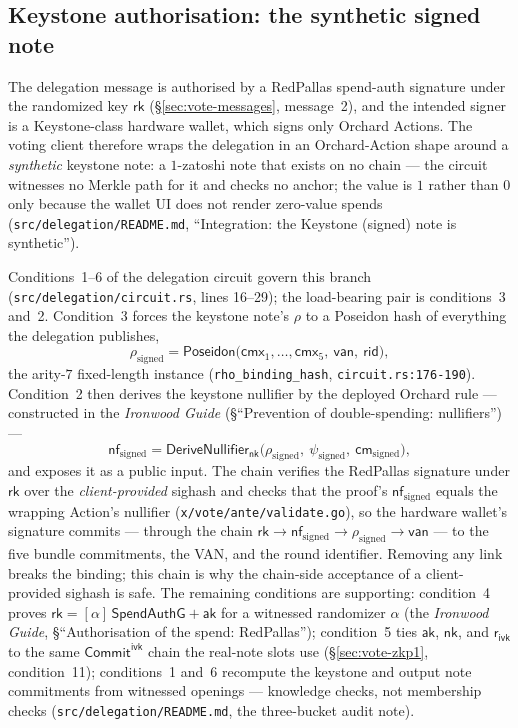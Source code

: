 \documentclass[11pt,a4paper]{article}
\theoremstyle{definition}
\newcommand{\nfsym}{\mathsf{nf}}
\newcommand{\cmsym}{\mathsf{cm}}
\newcommand{\cmx}{\mathsf{cmx}}
\newcommand{\rk}{\mathsf{rk}}
\newcommand{\CommitIvk}{\ensuremath{\mathsf{Commit}^{\mathsf{ivk}}}}
\newcommand{\aksym}{\ensuremath{\mathsf{ak}}}
\newcommand{\nksym}{\ensuremath{\mathsf{nk}}}
\newcommand{\rivk}{\ensuremath{\mathsf{r_{ivk}}}}
\begin{document}
\subsection{Keystone authorisation: the synthetic signed note}
\label{sec:vote-keystone}

The delegation message is authorised by a RedPallas spend-auth signature
under the randomized key $\rk$ (\S\ref{sec:vote-messages}, message~2), and
the intended signer is a Keystone-class hardware wallet, which signs only
Orchard Actions. The voting client therefore wraps the delegation in an
Orchard-Action shape around a \emph{synthetic} keystone note: a
$1$-zatoshi note that exists on no chain --- the circuit witnesses no
Merkle path for it and checks no anchor; the value is $1$ rather than $0$
only because the wallet UI does not render zero-value spends
(\texttt{src/delegation/README.md}, ``Integration: the Keystone (signed)
note is synthetic'').

Conditions~1--6 of the delegation circuit govern this branch
(\texttt{src/delegation/circuit.rs}, lines 16--29); the load-bearing pair
is conditions~3 and~2. Condition~3 forces the keystone note's $\rho$ to a
Poseidon hash of everything the delegation publishes,
\[
\rho_{\mathrm{signed}} = \mathsf{Poseidon}\bigl(\cmx_1, \ldots, \cmx_5,\
\mathsf{van},\ \mathsf{rid}\bigr),
\]
the arity-$7$ fixed-length instance (\texttt{rho\_binding\_hash},
\texttt{circuit.rs:176-190}). Condition~2 then derives the keystone
nullifier by the deployed Orchard rule --- constructed in the
\emph{Ironwood Guide} (\S``Prevention of double-spending: nullifiers'') ---
\[
\nfsym_{\mathrm{signed}} =
\mathsf{DeriveNullifier}_{\nksym}\bigl(\rho_{\mathrm{signed}},\
\psi_{\mathrm{signed}},\ \cmsym_{\mathrm{signed}}\bigr),
\]
and exposes it as a public input. The chain verifies the RedPallas
signature under $\rk$ over the \emph{client-provided} sighash and checks
that the proof's $\nfsym_{\mathrm{signed}}$ equals the wrapping Action's
nullifier (\texttt{x/vote/ante/validate.go}), so the hardware wallet's
signature commits --- through the chain
$\rk \rightarrow \nfsym_{\mathrm{signed}} \rightarrow
\rho_{\mathrm{signed}} \rightarrow \mathsf{van}$ --- to the five bundle
commitments, the VAN, and the round identifier. Removing any link breaks
the binding; this chain is why the chain-side acceptance of a
client-provided sighash is safe. The remaining conditions are supporting:
condition~4 proves $\rk = [\alpha]\,\mathsf{SpendAuthG} + \aksym$ for a
witnessed randomizer $\alpha$ (the \emph{Ironwood Guide},
\S``Authorisation of the spend: RedPallas''); condition~5 ties $\aksym$,
$\nksym$, and $\rivk$ to the same \CommitIvk{} chain the real-note slots
use (\S\ref{sec:vote-zkp1}, condition~11); conditions~1 and~6 recompute
the keystone and output note commitments from witnessed openings ---
knowledge checks, not membership checks
(\texttt{src/delegation/README.md}, the three-bucket audit note).
\end{document}
